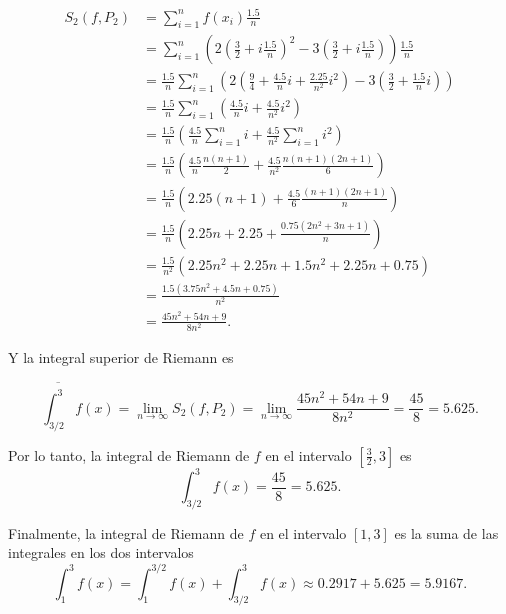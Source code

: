 \documentclass[
  spanish,
  a4paper,
]{scrreport}
\theoremstyle{definition}
\theoremstyle{remark}
\begin{document}
\begin{tcolorbox}
\begin{align*}
S_2(f,P_2) &= \sum_{i=1}^{n} f(x_i)\frac{1.5}{n}\\
&= \sum_{i=1}^{n} \left(2\left(\frac{3}{2}+i\frac{1.5}{n}\right)^2 - 3\left(\frac{3}{2}+i\frac{1.5}{n}\right)\right)\frac{1.5}{n}\\
&= \frac{1.5}{n} \sum_{i=1}^{n} \left(2\left(\frac{9}{4}+\frac{4.5}{n}i+\frac{2.25}{n^2}i^2\right)-3\left(\frac{3}{2}+\frac{1.5}{n}i\right)\right)\\
&= \frac{1.5}{n} \sum_{i=1}^{n} \left(\frac{4.5}{n}i+\frac{4.5}{n^2}i^2\right)\\
&= \frac{1.5}{n} \left(\frac{4.5}{n}\sum_{i=1}^{n} i + \frac{4.5}{n^2}\sum_{i=1}^{n} i^2\right)\\
&= \frac{1.5}{n} \left(\frac{4.5}{n}\frac{n(n+1)}{2} + \frac{4.5}{n^2}\frac{n(n+1)(2n+1)}{6}\right)\\
&= \frac{1.5}{n} \left(2.25(n+1) + \frac{4.5}{6}\frac{(n+1)(2n+1)}{n}\right)\\
&= \frac{1.5}{n} \left(2.25n+2.25 + \frac{0.75(2n^2+3n+1)}{n}\right)\\
&= \frac{1.5}{n^2} \left(2.25n^2+2.25n + 1.5n^2+2.25n+0.75\right)\\
&= \frac{1.5(3.75n^2 + 4.5n + 0.75)}{n^2}\\
&= \frac{45n^2+54n+9}{8n^2}.
\end{align*}

Y la integral superior de Riemann es

\[
\overline{\int_{3/2}^3} f(x)  = \lim_{n \to \infty} S_2(f,P_2) = \lim_{n \to \infty} \frac{45n^2+54n+9}{8n^2} = \frac{45}{8} = 5.625.
\]

Por lo tanto, la integral de Riemann de \(f\) en el intervalo
\([\frac{3}{2}, 3]\) es \[
\int_{3/2}^3 f(x) = \frac{45}{8} = 5.625.
\]

Finalmente, la integral de Riemann de \(f\) en el intervalo \([1, 3]\)
es la suma de las integrales en los dos intervalos \[
\int_1^3 f(x) = \int_1^{3/2} f(x) + \int_{3/2}^3 f(x) \approx 0.2917 + 5.625 = 5.9167.
\]

\end{tcolorbox}
\end{document}
